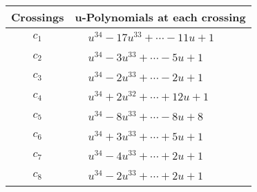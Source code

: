 \documentclass[1p]{elsarticle_modified}
\theoremstyle{definition}
\begin{document}
\begin{tabular}{m{50pt}|m{274pt}}
Crossings & \hspace{64pt}u-Polynomials at each crossing \\
\hline $$\begin{aligned}c_{1}\end{aligned}$$&$\begin{aligned}
&u^{34}-17 u^{33}+\cdots-11 u+1
\end{aligned}$\\
\hline $$\begin{aligned}c_{2}\end{aligned}$$&$\begin{aligned}
&u^{34}-3 u^{33}+\cdots-5 u+1
\end{aligned}$\\
\hline $$\begin{aligned}c_{3}\end{aligned}$$&$\begin{aligned}
&u^{34}-2 u^{33}+\cdots-2 u+1
\end{aligned}$\\
\hline $$\begin{aligned}c_{4}\end{aligned}$$&$\begin{aligned}
&u^{34}+2 u^{32}+\cdots+12 u+1
\end{aligned}$\\
\hline $$\begin{aligned}c_{5}\end{aligned}$$&$\begin{aligned}
&u^{34}-8 u^{33}+\cdots-8 u+8
\end{aligned}$\\
\hline $$\begin{aligned}c_{6}\end{aligned}$$&$\begin{aligned}
&u^{34}+3 u^{33}+\cdots+5 u+1
\end{aligned}$\\
\hline $$\begin{aligned}c_{7}\end{aligned}$$&$\begin{aligned}
&u^{34}-4 u^{33}+\cdots+2 u+1
\end{aligned}$\\
\hline $$\begin{aligned}c_{8}\end{aligned}$$&$\begin{aligned}
&u^{34}-2 u^{33}+\cdots+2 u+1
\end{aligned}$\\

\end{tabular}
\end{document}
